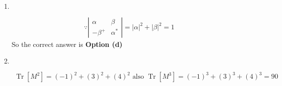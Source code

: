 \begin{enumerate}
\begin{answer}
\begin{align*}
	\left(\begin{array}{lll}0 & 0 & 1 \\ 0 & 1 & 0 \\ 1 & 0 & 0\end{array}\right)\left(\begin{array}{c}a \\ -2 a \\ a\end{array}\right)&=\left(\begin{array}{c}a \\ -2 a \\ a\end{array}\right)\text{ and }\left(\begin{array}{ccc}0 & 1 & 1 \\ 1 & 0 & 1 \\ 1 & 1 & 0\end{array}\right)\left(\begin{array}{c}a \\ -2 a \\ a\end{array}\right)=\left(\begin{array}{c}-a \\ 2 a \\ -a\end{array}\right)=-1\left(\begin{array}{c}a \\ -2 a \\ a\end{array}\right)
	\intertext{For other combination above relation is not possible.}
		\end{align*}
		So the correct answer is \textbf{Option (b)}
	\end{answer}
	\item $\left. \right. $		
\begin{answer}
	\begin{align*}
	\because\left|\begin{array}{cc}\alpha & \beta \\ -\beta^{+} & \alpha^{*}\end{array}\right|=|\alpha|^{2}+|\beta|^{2}=1
	\end{align*}
	So the correct answer is \textbf{Option (d)}
\end{answer}
	\item $\left. \right. $	
	\begin{answer}
		\begin{align*}
		 \operatorname{Tr}\left[M^{2}\right]=(-1)^{2}+(3)^{2}+(4)^{2}\text{ also } \operatorname{Tr}\left[M^{3}\right]=(-1)^{3}+(3)^{3}+(4)^{3}=90

\end{align*}
\end{answer}
\end{enumerate}
